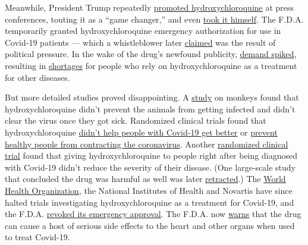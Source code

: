 Meanwhile, President Trump repeatedly
\href{https://www.nytimes.com/2020/04/06/us/politics/coronavirus-trump-malaria-drug.html}{promoted
hydroxychloroquine} at press conferences, touting it as a ``game
changer,'' and even
\href{https://www.nytimes.com/2020/05/18/us/politics/trump-hydroxychloroquine-covid-coronavirus.html}{took
it himself}. The F.D.A. temporarily granted hydroxychloroquine emergency
authorization for use in Covid-19 patients --- which a whistleblower
later
\href{https://www.buzzfeednews.com/article/zahrahirji/fda-eua-hydroxychloroquine-chloroquine}{claimed}
was the result of political pressure. In the wake of the drug's newfound
publicity,
\href{https://www.nytimes.com/2020/04/25/us/coronavirus-trump-chloroquine-hydroxychloroquine.html}{demand
spiked}, resulting in
\href{https://ard.bmj.com/content/early/2020/07/01/annrheumdis-2020-218164}{shortages}
for people who rely on hydroxychloroquine as a treatment for other
diseases.

But more detailed studies proved disappointing. A
\href{https://www.nature.com/articles/s41586-020-2558-4}{study} on
monkeys found that hydroxychloroquine didn't prevent the animals from
getting infected and didn't clear the virus once they got sick.
Randomized clinical trials found that hydroxychloroquine
\href{https://www.recoverytrial.net/news/statement-from-the-chief-investigators-of-the-randomised-evaluation-of-covid-19-therapy-recovery-trial-on-hydroxychloroquine-5-june-2020-no-clinical-benefit-from-use-of-hydroxychloroquine-in-hospitalised-patients-with-covid-19}{didn't
help people with Covid-19 get better} or
\href{https://www.nytimes.com/2020/06/03/health/hydroxychloroquine-coronavirus-trump.html}{prevent
healthy people from contracting the coronavirus}. Another
\href{https://www.acpjournals.org/doi/10.7326/M20-4207}{randomized
clinical trial} found that giving hydroxychloroquine to people right
after being diagnosed with Covid-19 didn't reduce the severity of their
disease. (One large-scale study that concluded the drug was harmful as
well was later
\href{https://www.nytimes.com/2020/06/04/health/coronavirus-hydroxychloroquine.html?searchResultPosition=1}{retracted}.)
The
\href{https://www.who.int/news-room/detail/04-07-2020-who-discontinues-hydroxychloroquine-and-lopinavir-ritonavir-treatment-arms-for-covid-19}{World
Health Organization}, the National Institutes of Health and Novartis
have since halted trials investigating hydroxychloroquine as a treatment
for Covid-19, and the F.D.A.
\href{https://www.nytimes.com/2020/06/15/health/fda-hydroxychloroquine-malaria.html}{revoked
its emergency approval}. The F.D.A. now
\href{https://www.fda.gov/drugs/drug-safety-and-availability/fda-cautions-against-use-hydroxychloroquine-or-chloroquine-covid-19-outside-hospital-setting-or}{warns}
that the drug can cause a host of serious side effects to the heart and
other organs when used to treat Covid-19.

